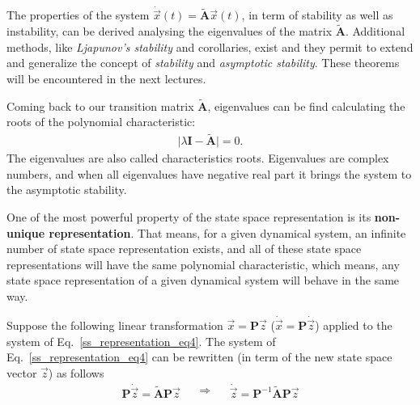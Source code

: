 \documentclass[11pt,a4paper,oneside]{book}
\numberwithin{equation}{section}
\theoremstyle{it}
\theoremstyle{definition}
\begin{document}
The properties of the system $\dot{\vec{x}}(t)=\tilde{\mathbf{A}}\vec{x}(t)$, 
in term of stability as well as instability, can be derived analysing the 
eigenvalues of the matrix $\tilde{\mathbf{A}}$. Additional methods, like 
\textit{Ljapunov's stability} and corollaries, exist and they permit to extend 
and generalize the concept of \textit{stability} and \textit{asymptotic 
stability}. These theorems will be encountered in the next lectures.

Coming back to our transition matrix $\tilde{\mathbf{A}}$, eigenvalues can be find calculating the roots of the polynomial characteristic:
\begin{equation}\label{ss_representation_eq5}
	\begin{aligned}
		\Big|\lambda\mathbf{I}-\tilde{\mathbf{A}}\Big|=0.
	\end{aligned}
\end{equation}
The eigenvalues are also called characteristics roots. Eigenvalues are complex 
numbers, and when all eigenvalues have negative real part it brings the system 
to the asymptotic stability. 

One of the most powerful property of the state space representation is its 
\textbf{non-unique representation}. That means, for a given dynamical system, 
an infinite number of state space representation exists, and all of these state 
space representations will have the same polynomial characteristic, which 
means, any state space representation of a given dynamical system will behave 
in the same way. 

Suppose the following linear transformation $\vec{x}=\mathbf{P}\vec{z}$ 
($\dot{\vec{x}}=\mathbf{P}\dot{\vec{z}}$) applied to the system of 
Eq.~\eqref{ss_representation_eq4}. The system of 
Eq.~\eqref{ss_representation_eq4} can be rewritten (in term of the new state 
space vector $\vec{z}$) as follows
\begin{equation}\label{ss_representation_eq6}
	\begin{aligned}
		\mathbf{P}\dot{\vec{z}}=\tilde{\mathbf{A}}\mathbf{P}\vec{z}
	\end{aligned}\quad\Rightarrow\quad
	\begin{aligned}
	\dot{\vec{z}}=\mathbf{P}^{-1}\tilde{\mathbf{A}}\mathbf{P}\vec{z}
	\end{aligned}
\end{equation}
\end{document}
